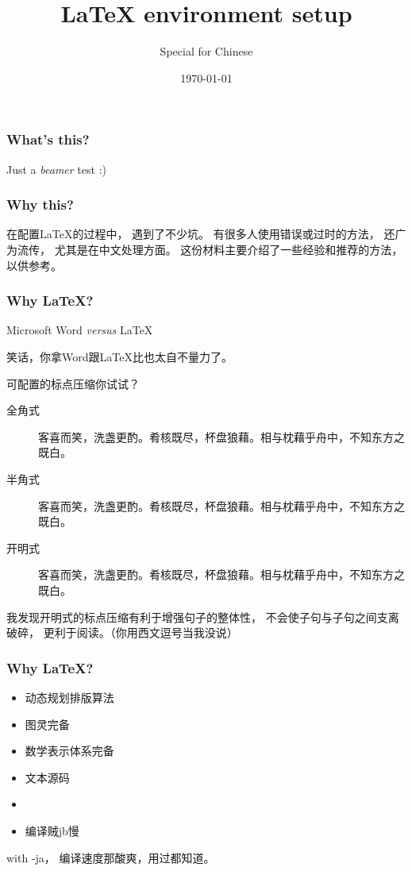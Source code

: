 \documentclass{beamer}
\title{\LaTeX{} environment setup}
\subtitle{Special for Chinese}
\author{\TitanSnow}
\date{\today}
\begin{document}
    \frame{\titlepage}
    \begin{frame}
        \frametitle{What's this?}
        Just a \textit{beamer} test :)
    \end{frame}
    \begin{frame}
        \frametitle{Why this?}
        在配置\LaTeX{}的过程中，
        遇到了不少坑。
        有很多人使用错误或过时的方法，
        还广为流传，
        尤其是在中文处理方面。
        这份材料主要介绍了一些经验和推荐的方法，
        以供参考。
    \end{frame}
    \begin{frame}
        \frametitle{Why \LaTeX{}?}
        Microsoft Word \textit{versus} \LaTeX\pause

        笑话，你拿Word跟\LaTeX{}比也太自不量力了。\pause

        可配置的标点压缩你试试？
        \begin{description}
            \item[全角式]{\rmfamily{}客喜而笑，洗盏更酌。肴核既尽，杯盘狼藉。相与枕藉乎舟中，不知东方之既白。}
            \item[半角式]{\rmfamily{}客喜而笑，洗盏更酌。肴核既尽，杯盘狼藉。相与枕藉乎舟中，不知东方之既白。}
            \item[开明式]{\rmfamily{}客喜而笑，洗盏更酌。肴核既尽，杯盘狼藉。相与枕藉乎舟中，不知东方之既白。}
        \end{description}\pause
        我发现开明式的标点压缩有利于增强句子的整体性，
        不会使子句与子句之间支离破碎，
        更利于阅读。（你用西文逗号当我没说）
    \end{frame}
    \begin{frame}
        \frametitle{Why \LaTeX{}?}
        \begin{description}[labelwidth=\widthof{Disadvantage}]
            \item<2->[Advantage]{
                \begin{itemize}
                    \item<2-> 动态规划排版算法
                    \item<3-> 图灵完备
                    \item<4-> 数学表示体系完备
                    \item<5-> 文本源码
                    \item<6-> \textellipsis
                \end{itemize}
            }
            \item<7->[Disadvantage]{
                \begin{itemize}
                    \item<7-> 编译贼jb慢
                \end{itemize}
            }
        \end{description}\pause[8]

         with -ja，
        编译速度那酸爽，用过都知道。
    \end{frame}
\end{document}
